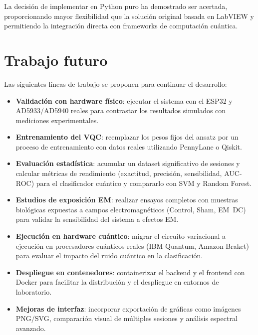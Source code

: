 \documentclass[11pt,a4paper,spanish]{book}
\begin{document}
La decisi\'{o}n de implementar en Python puro ha demostrado ser acertada, proporcionando mayor flexibilidad que la soluci\'{o}n original basada en LabVIEW y permitiendo la integraci\'{o}n directa con frameworks de computaci\'{o}n cu\'{a}ntica.

\section{Trabajo futuro}

Las siguientes l\'{i}neas de trabajo se proponen para continuar el desarrollo:
\begin{itemize}
	\item \textbf{Validaci\'{o}n con hardware f\'{i}sico}: ejecutar el sistema con el ESP32 y AD5933/AD5940 reales para contrastar los resultados simulados con mediciones experimentales.
	\item \textbf{Entrenamiento del VQC}: reemplazar los pesos fijos del ansatz por un proceso de entrenamiento con datos reales utilizando PennyLane o Qiskit.
	\item \textbf{Evaluaci\'{o}n estad\'{i}stica}: acumular un dataset significativo de sesiones y calcular m\'{e}tricas de rendimiento (exactitud, precisi\'{o}n, sensibilidad, AUC-ROC) para el clasificador cu\'{a}ntico y compararlo con SVM y Random Forest.
	\item \textbf{Estudios de exposici\'{o}n EM}: realizar ensayos completos con muestras biol\'{o}gicas expuestas a campos electromagn\'{e}ticos (Control, Sham, EM~DC) para validar la sensibilidad del sistema a efectos EM.
	\item \textbf{Ejecuci\'{o}n en hardware cu\'{a}ntico}: migrar el circuito variacional a ejecuci\'{o}n en procesadores cu\'{a}nticos reales (IBM Quantum, Amazon Braket) para evaluar el impacto del ruido cu\'{a}ntico en la clasificaci\'{o}n.
	\item \textbf{Despliegue en contenedores}: containerizar el backend y el frontend con Docker para facilitar la distribuci\'{o}n y el despliegue en entornos de laboratorio.
	\item \textbf{Mejoras de interfaz}: incorporar exportaci\'{o}n de gr\'{a}ficas como im\'{a}genes PNG/SVG, comparaci\'{o}n visual de m\'{u}ltiples sesiones y an\'{a}lisis espectral avanzado.
\end{itemize}
\end{document}
